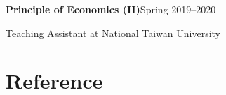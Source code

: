\documentclass{article}
\newcommand{\cvsection}[1]{\section*{\rmfamily#1}}
\begin{document}
\textbf{Principle of Economics (II)}\hfill Spring 2019--2020

\hspace{2em}Teaching Assistant at National Taiwan University


















\cvsection{Reference}
\indent
\end{document}
